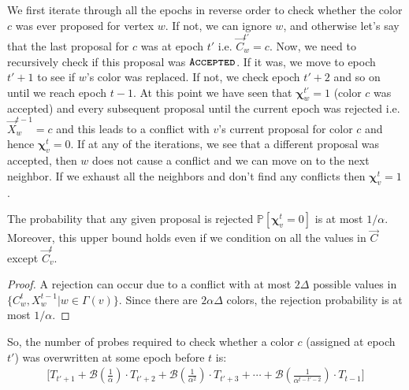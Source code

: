 We first iterate through all the epochs in reverse order to check whether the color $c$ was ever proposed for vertex $w$.
If not, we can ignore $w$, and otherwise let's say that the last proposal for $c$ was at epoch $t'$ i.e. $\vec C^{t'}_w = c$.
Now, we need to recursively check if this proposal was $\texttt{\textsc{Accepted}}$.
If it was, we move to epoch $t'+1$ to see if $w$'s color was replaced.
If not, we check epoch $t'+2$ and so on until we reach epoch $t-1$.
At this point we have seen that $\bm\chi^{t'}_w = 1$ (color $c$ was accepted) and every subsequent proposal until the current epoch was rejected
i.e. $\vec X^{t-1}_w = c$ and this leads to a conflict with $v$'s current proposal for color $c$ and hence $\bm\chi^t_v = 0$.
If at any of the iterations, we see that a different proposal was accepted, then $w$ does not cause a conflict and we can move on to the next neighbor.
If we exhaust all the neighbors and don't find any conflicts then $\bm\chi^t_v = 1$.

\begin{lemma}
\label{lem:color_reject_probability}
The probability that any given proposal is rejected $\mathbb P[\bm\chi^t_v=0]$ is at most $1/\alpha$.
Moreover, this upper bound holds even if we condition on all the values in $\vec C$ except $\vec C^t_v$.
\end{lemma}
\begin{proof}
A rejection can occur due to a conflict with at most $2\Delta$ possible values in $\{ C^t_w, X^{t-1}_w | w\in\Gamma(v)\}$.
Since there are $2\alpha\Delta$ colors, the rejection probability is at most $1/\alpha$.
\end{proof}

So, the number of probes required to check whether a color $c$ (assigned at epoch $t'$) was overwritten at some epoch before $t$ is:
\begin{align}
\label{eq:color_overwrite}
\Biggl[T_{t'+1} + \mathcal B\left(\frac{1}{\alpha}\right)\cdot T_{t'+2}
+ \mathcal B\left(\frac{1}{\alpha^2}\right)\cdot T_{t'+3} + \cdots
+ \mathcal B\left(\frac{1}{\alpha^{t-t'-2}}\right)\cdot T_{t-1} \Biggr]
\end{align}

